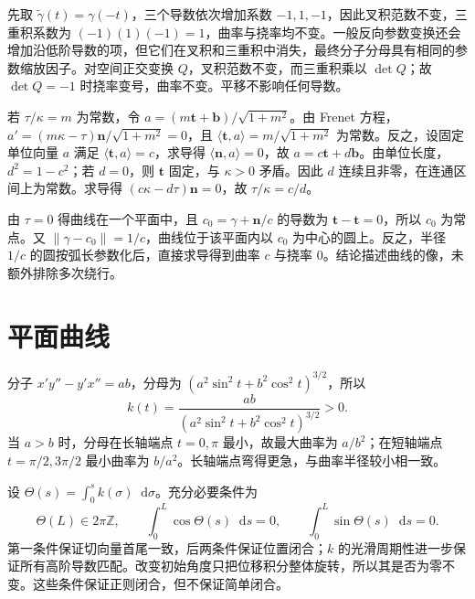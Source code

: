 \documentclass[UTF8,12pt,a4paper,fontset=fandol]{ctexbook}
\newcommand{\dd}{\mathop{}\!\mathrm d}
\newcommand{\ip}[2]{\langle #1,#2\rangle}
\newcommand{\norm}[1]{\lVert #1\rVert}
\begin{document}
\begin{solve}
先取 $\widetilde\gamma(t)=\gamma(-t)$，三个导数依次增加系数 $-1,1,-1$，因此叉积范数不变，三重积系数为 $(-1)(1)(-1)=1$，曲率与挠率均不变。一般反向参数变换还会增加沿低阶导数的项，但它们在叉积和三重积中消失，最终分子分母具有相同的参数缩放因子。对空间正交变换 $Q$，叉积范数不变，而三重积乘以 $\det Q$；故 $\det Q=-1$ 时挠率变号，曲率不变。平移不影响任何导数。
\end{solve}

\begin{solve}
若 $\tau/\kappa=m$ 为常数，令 $a=(m\mathbf t+\mathbf b)/\sqrt{1+m^2}$。由 Frenet 方程，$a'=(m\kappa-\tau)\mathbf n/\sqrt{1+m^2}=0$，且 $\ip{\mathbf t}a=m/\sqrt{1+m^2}$ 为常数。反之，设固定单位向量 $a$ 满足 $\ip{\mathbf t}a=c$，求导得 $\ip{\mathbf n}a=0$，故 $a=c\mathbf t+d\mathbf b$。由单位长度，$d^2=1-c^2$；若 $d=0$，则 $\mathbf t$ 固定，与 $\kappa>0$ 矛盾。因此 $d$ 连续且非零，在连通区间上为常数。求导得 $(c\kappa-d\tau)\mathbf n=0$，故 $\tau/\kappa=c/d$。
\end{solve}

\begin{solve}
由 $\tau=0$ 得曲线在一个平面中，且 $c_0=\gamma+\mathbf n/c$ 的导数为 $\mathbf t-\mathbf t=0$，所以 $c_0$ 为常点。又 $\norm{\gamma-c_0}=1/c$，曲线位于该平面内以 $c_0$ 为中心的圆上。反之，半径 $1/c$ 的圆按弧长参数化后，直接求导得到曲率 $c$ 与挠率 $0$。结论描述曲线的像，未额外排除多次绕行。
\end{solve}

\section{平面曲线}
\begin{solve}
分子 $x'y''-y'x''=ab$，分母为 $(a^2\sin^2t+b^2\cos^2t)^{3/2}$，所以
\[
 k(t)=\frac{ab}{(a^2\sin^2t+b^2\cos^2t)^{3/2}}>0.
\]
当 $a>b$ 时，分母在长轴端点 $t=0,\pi$ 最小，故最大曲率为 $a/b^2$；在短轴端点 $t=\pi/2,3\pi/2$ 最小曲率为 $b/a^2$。长轴端点弯得更急，与曲率半径较小相一致。
\end{solve}

\begin{solve}
设 $\Theta(s)=\int_0^s k(\sigma)\dd\sigma$。充分必要条件为
\[
 \Theta(L)\in2\pi\mathbb Z,\qquad
 \int_0^L\cos\Theta(s)\dd s=0,\qquad
 \int_0^L\sin\Theta(s)\dd s=0.
\]
第一条件保证切向量首尾一致，后两条件保证位置闭合；$k$ 的光滑周期性进一步保证所有高阶导数匹配。改变初始角度只把位移积分整体旋转，所以其是否为零不变。这些条件保证正则闭合，但不保证简单闭合。
\end{solve}
\end{document}
